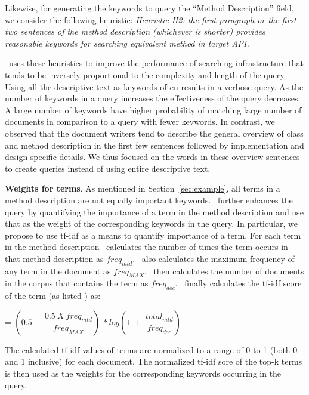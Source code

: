 Likewise, for generating the keywords to query the ``Method Description'' field, we consider the following heuristic: \textit{Heuristic H2: the first paragraph or the first two sentences of the method description (whichever is shorter) provides reasonable keywords for searching equivalent method in target API.}

\tool\ uses these heuristics to improve the performance of searching infrastructure
that tends to be inversely proportional to the complexity and length of the query.
Using all the descriptive text as keywords often results in a verbose query.
As the number of keywords in a query increases the effectiveness of the query decreases.
A large number of keywords have higher probability of matching large number of documents in comparison to a query with fewer keywords.
In contrast, we observed that the document writers tend to describe the general
overview of class and method description in the first few sentences followed by implementation and design specific details.
We thus focused on the words in these overview sentences to create queries instead of using entire descriptive text.


\textbf{Weights for terms}. As mentioned in Section~\ref{sec:example},
all terms in a method description are not equally important keywords. 
\tool\ further enhances the query by quantifying the importance of a term in the method description and use that as the weight of the corresponding keywords in the query.
In particular, we propose to use tf-idf\cite{manning2008introduction} as a means to quantify importance of a term.
For each term in the method description \tool\ calculates the number of times the term occurs in that method description as $freq_{mtd}$.
\tool\ also calculates the maximum frequency of any term in the document as $freq_{MAX}$.
\tool\ then calculates the number of documents in the corpus that contains the term as $freq_{doc}$.
\tool\ finally calculates the tf-idf score of the term (as listed \cite{manning2008introduction}) as:

\begin{center}
	 = $(0.5\ +\dfrac{0.5\ X\ freq_{mtd}}{freq_{MAX}})\ * log(1\ +\ \dfrac{total_{mtd}}{freq_{doc}})$
\end{center}

The calculated tf-idf values of terms are normalized to a range of 0 to 1 (both 0 and 1 inclusive) for each document.
The normalized tf-idf sore of the top-k terms is then used as the weights for the corresponding  keywords occurring in the query.

